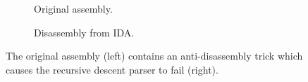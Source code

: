 





\begin{figure}[htbp]
	\centering
	\begin{subfigure}[t]{0.59\textwidth}
		
		\caption{Original assembly.}
	\end{subfigure}
	\qquad
	\begin{subfigure}[t]{0.34\textwidth}
		
		\caption{Disassembly from IDA.}
	\end{subfigure}
	\caption{The original assembly (left) contains an anti-disassembly trick which causes the recursive descent parser to fail (right).}
	\label{fig:anti-disassembly}
\end{figure}

